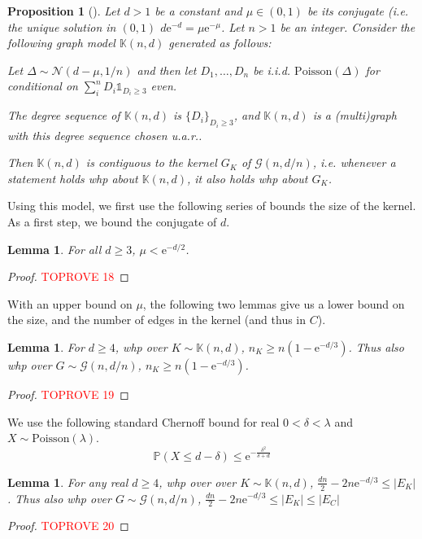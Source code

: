 \documentclass[11pt]{article}
\theoremstyle{plain}
\newtheorem{lemma}[theorem]{Lemma}
\newtheorem{proposition}[theorem]{Proposition}
\newcommand{\G}{\mathcal{G}}
\newcommand{\emm}{\mathrm{e}}
\newcommand{\Nc}{\mathcal{N}}
\renewcommand{\P}{\mathds{P}}
\newcommand{\1}{\mathbb{1}}
\newcommand{\Kb}{\mathbb{K}}
\newcommand{\Poisson}{\text{Poisson}}
\begin{document}
\begin{proposition}[{\cite[Theorem 1]{anatomy-of-giant}}]\label{prop:giant-model}
    Let \(d > 1\) be a constant and \(\mu\in(0,1)\) be its \emph{conjugate} (i.e. the unique solution in \((0,1)\) \(d\emm^{-d}=\mu\emm^{-\mu}\). Let \(n > 1\) be an integer. Consider the following graph model \(\Kb(n,d)\) generated as follows:

    Let \(\Delta\sim\Nc(d-\mu,1/n)\) and then let \(D_1,\dots,D_n\) be i.i.d. \(\Poisson(\Delta)\) for conditional on \(\sum_i^n D_i \1_{D_i \geq 3}\) even. 

    The degree sequence of \(\Kb(n,d)\) is \(\{D_i\}_{D_i\geq 3}\), and \(\Kb(n,d)\) is a (multi)graph with this degree sequence chosen u.a.r..
    





    Then \(\Kb(n,d)\) is \emph{contiguous} to the kernel \(G_K\) of \(\G(n,d/n)\), i.e. whenever a statement holds whp about \(\Kb(n,d)\), it also holds whp about \(G_K\).
\end{proposition}

Using this model, we first use the following series of bounds the size of the kernel. As a first step, we bound the conjugate of \(d\).

\begin{lemma}\label{lem:mu-bound}
    For all \(d\geq 3\), \(\mu < \emm^{-d/2}\).
\end{lemma}
\begin{proof}\textcolor{red}{TOPROVE 18}\end{proof}

With an upper bound on \(\mu\), the following two lemmas give us a lower bound on the size, and the number of edges in the kernel (and thus in \(C\)).
\begin{lemma}\label{lem:lower-bound-on-kernel-size}
    For \(d\geq 4\), whp over \(K\sim\Kb(n,d)\), \(n_K\geq n(1-\emm^{-d/3})\). Thus also whp over \(G\sim\G(n,d/n)\), \(n_K \geq n(1-\emm^{-d/3})\).
\end{lemma}
\begin{proof}\textcolor{red}{TOPROVE 19}\end{proof}
We use the following standard Chernoff bound for real \(0<\delta<\lambda\) and \(X\sim\Poisson(\lambda)\).\begin{equation}
    \P(X \leq d - \delta) \leq \emm^{-\frac{\delta^2}{\delta+d}}\label{eq:Poisson-lower-tail-bound}
\end{equation}
\begin{lemma}\label{lem:bound-on-kernel-edges}
    For any real \(d \geq 4\), whp over over \(K\sim\Kb(n,d)\), \(\frac{dn}{2} - 2n\emm^{-d/3}\leq |E_K|\). Thus also whp over \(G\sim\G(n,d/n)\), \(\frac{dn}{2} - 2n\emm^{-d/3}\leq |E_K|\leq |E_C|\) \end{lemma}
\begin{proof}\textcolor{red}{TOPROVE 20}\end{proof}
\end{document}
